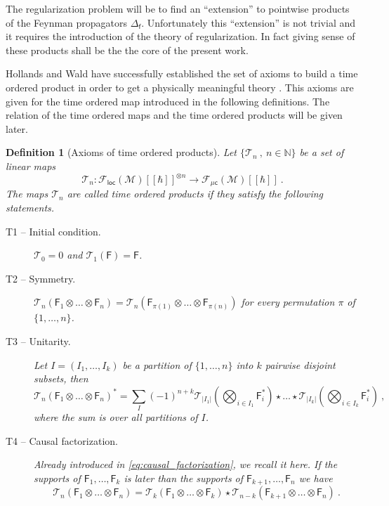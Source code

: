 \documentclass[11pt]{book}
\newcommand{\loc}{\mathsf{loc}}
\newcommand{\muc}{\mu\csf}
\newcommand{\abs}[1]{\left|#1\right|}
\newcommand{\Fcal}{\mathcal{F}}
\newcommand{\Mcal}{\mathcal{M}}
\newcommand{\Tcal}{\mathcal{T}}
\newcommand{\Nbb}{\mathbb{N}}
\newcommand{\Fsf}{\mathsf{F}}
\newcommand{\csf}{\mathsf{c}}
\newcommand{\fsf}{\mathsf{f}}
\theoremstyle{break}
\newtheorem{definition}{Definition}[chapter]
\begin{document}
The regularization problem will be to find an ``extension'' to pointwise products of the Feynman propagators $\Delta_\fsf$. Unfortunately this ``extension'' is not trivial and it requires the introduction of the theory of regularization. In fact giving sense of these products shall be the the core of the present work.


\bigskip


Hollands and Wald have successfully established the set of axioms to build a time ordered product in order to get a physically meaningful theory \cite{HW_2001,HW_2002,HW_2005}. This axioms are given for the time ordered map introduced in the following definitions. The relation of the time ordered maps and the time ordered products will be given later.


\begin{definition}[Axioms of time ordered products]
Let $\{\Tcal_n \ , \ n \in \Nbb\}$ be a set of linear maps 
%
\begin{equation*}
\Tcal_n : \Fcal_\loc(\Mcal)[[\hbar]]^{\otimes n} \to \Fcal_{\muc}(\Mcal)[[\hbar]] \ . 
\end{equation*}
%
The maps $\Tcal_n$ are called time ordered products if they satisfy the following statements.
%
\begin{description}
\item[T1 -- Initial condition.]\label{item:T1} $\Tcal_0 = 0$ and $\Tcal_1(\Fsf) = \Fsf$.
%
\item[T2 -- Symmetry.]\label{item:T2} $\Tcal_n(\Fsf_1\otimes\dots\otimes\Fsf_n) = \Tcal_n(\Fsf_{\pi(1)}\otimes\dots\otimes\Fsf_{\pi(n)})$ for every permutation $\pi$ of $\{1,\dots,n\}$.
%
\item[T3 -- Unitarity.]\label{item:T3} Let $I=(I_1,\dots,I_k)$ be a partition of $\{1,\dots,n\}$ into $k$ pairwise disjoint subsets, then
%
\begin{equation*}
\Tcal_n(\Fsf_1\otimes\dots\otimes\Fsf_n)^\ast = \sum_{I} (-1)^{n+k} \Tcal_{\abs{I_1}}\left(\bigotimes_{i\in I_1} \Fsf_i^\ast \right) \star \dots \star \Tcal_{\abs{I_k}}\left(\bigotimes_{i\in I_k} \Fsf_i^\ast \right) \ ,
\end{equation*}
%
where the sum is over all partitions of $I$.
%
\item[T4 -- Causal factorization.]\label{item:T4} Already introduced in \eqref{eq:causal_factorization}, we recall it here. If the supports of $\Fsf_1,\dots,\Fsf_k$ is later than the supports of $\Fsf_{k+1} , \dots , \Fsf_{n}$ we have
\begin{equation*}
\Tcal_n(\Fsf_1\otimes\dots\otimes\Fsf_n) = \Tcal_k(\Fsf_1\otimes\dots\otimes\Fsf_k) \star \Tcal_{n-k} (\Fsf_{k+1}\otimes\dots\otimes\Fsf_n) \ .

\end{equation*}
\end{description}
\end{definition}
\end{document}
